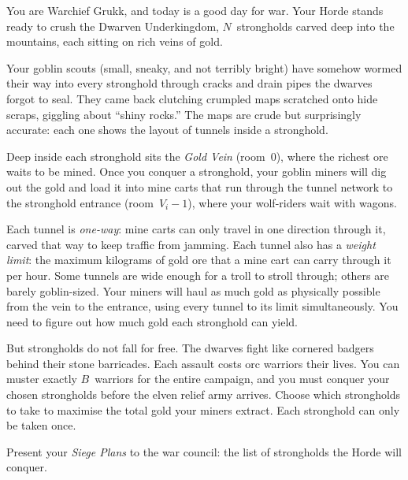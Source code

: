 
\setlength{\parindent}{0pt}
\setlength{\parskip}{6pt}

You are Warchief Grukk, and today is a good day for war.
Your Horde stands ready to crush the Dwarven Underkingdom,
$N$~strongholds carved deep into the mountains, each sitting on rich
veins of gold.

Your goblin scouts (small, sneaky, and not terribly bright) have
somehow wormed their way into every stronghold through cracks and drain
pipes the dwarves forgot to seal. They came back clutching crumpled
maps scratched onto hide scraps, giggling about ``shiny rocks.''
The maps are crude but surprisingly accurate: each one shows the layout
of tunnels inside a stronghold.

Deep inside each stronghold sits the \emph{Gold Vein} (room~$0$),
where the richest ore waits to be mined. Once you conquer a stronghold,
your goblin miners will dig out the gold and load it into mine carts
that run through the tunnel network to the stronghold entrance
(room~$V_i - 1$), where your wolf-riders wait with wagons.

Each tunnel is \emph{one-way}: mine carts can only travel in one
direction through it, carved that way to keep traffic from jamming.
Each tunnel also has a \emph{weight limit}: the maximum kilograms of
gold ore that a mine cart can carry through it per hour. Some tunnels
are wide enough for a troll to stroll through; others are barely
goblin-sized. Your miners will haul as much gold as physically possible
from the vein to the entrance, using every tunnel to its limit
simultaneously. You need to figure out how much gold each stronghold
can yield.

But strongholds do not fall for free. The dwarves fight like cornered
badgers behind their stone barricades. Each assault costs orc warriors
their lives. You can muster exactly $B$~warriors for the entire
campaign, and you must conquer your chosen strongholds before the elven
relief army arrives. Choose which strongholds to take to maximise the
total gold your miners extract. Each stronghold can only be taken once.

Present your \emph{Siege Plans} to the war council: the list of
strongholds the Horde will conquer.

